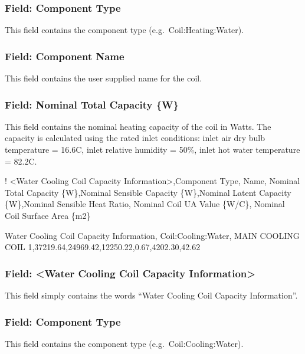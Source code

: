 \subsubsection{Field: Component Type}\label{field-component-type-1}

This field contains the component type (e.g.~Coil:Heating:Water).

\subsubsection{Field: Component Name}\label{field-component-name-1}

This field contains the user supplied name for the coil.

\subsubsection{Field: Nominal Total Capacity \{W\}}\label{field-nominal-total-capacity-w}

This field contains the nominal heating capacity of the coil in Watts. The capacity is calculated using the rated inlet conditions: inlet air dry bulb temperature = 16.6C, inlet relative humidity = 50\%, inlet hot water temperature = 82.2C.

! \textless{}Water Cooling Coil Capacity Information\textgreater{},Component Type, Name, Nominal Total Capacity \{W\},Nominal Sensible Capacity \{W\},Nominal Latent Capacity \{W\},Nominal Sensible Heat Ratio, Nominal Coil UA Value \{W/C\}, Nominal Coil Surface Area \{m2\}

Water Cooling Coil Capacity Information, Coil:Cooling:Water, MAIN COOLING COIL 1,37219.64,24969.42,12250.22,0.67,4202.30,42.62

\subsubsection{Field: \textless{}Water Cooling Coil Capacity Information\textgreater{}}\label{field-water-cooling-coil-capacity-information}

This field simply contains the words ``Water Cooling Coil Capacity Information''.

\subsubsection{Field: Component Type}\label{field-component-type-2}

This field contains the component type (e.g.~Coil:Cooling:Water).

